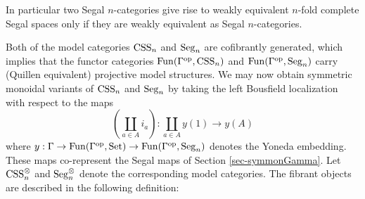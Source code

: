 \documentclass[a4paper]{amsart}
\begin{document}
%
%


In particular two Segal $n$-categories give rise to weakly equivalent $n$-fold complete Segal spaces only if they are weakly equivalent as Segal $n$-categories. 

Both of the model categories $\mathrm{CSS}_n$ and $\mathrm{Seg}_n$ are cofibrantly generated, which 
implies that the functor categories $\operatorname{Fun}(\Gamma^{\mathrm{op}}, \mathrm{CSS}_n)$ and $\operatorname{Fun}(\Gamma^{\mathrm{op}}, \mathrm{Seg}_n)$ carry (Quillen equivalent) projective model structures. We may now obtain symmetric monoidal variants of $\mathrm{CSS}_n$ and $\mathrm{Seg}_n$ by taking the left Bousfield localization with respect to the maps 
\begin{equation*}
	\left(\coprod_{a \in A} i_a\right) :   \coprod_{a \in A} y(1) \to y(A)
\end{equation*}
where $y: \Gamma \to \operatorname{Fun}(\Gamma^{\mathrm{op}}, \mathrm{Set}) \to \operatorname{Fun}(\Gamma^{\mathrm{op}}, \mathrm{Seg}_n)$ denotes the Yoneda embedding. These maps co-represent the Segal maps of Section \ref{sec-symmonGamma}. Let $\mathrm{CSS}_n^{\otimes}$ and $\mathrm{Seg}_n^{\otimes}$ denote the corresponding model categories. 
The fibrant objects are described in the following definition:
\end{document}
